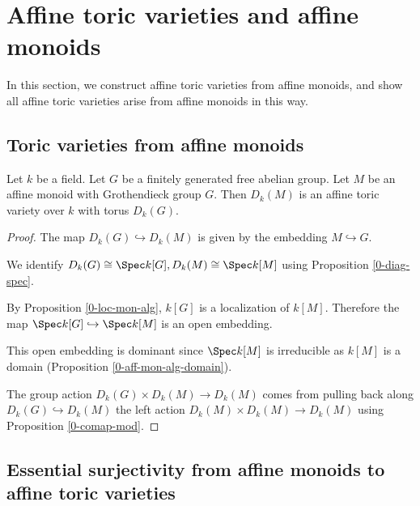 \section{Affine toric varieties and affine monoids}\label{sec:aff-tor-var}


In this section, we construct affine toric varieties from affine monoids,
and show all affine toric varieties arise from affine monoids in this way.


\subsection{Toric varieties from affine monoids}


\begin{proposition}
  \label{1-1-aff-tor-var-diag-aff-mon}

  Let $k$ be a field.
  Let $G$ be a finitely generated free abelian group.
  Let $M$ be an affine monoid with Grothendieck group $G$.
  Then $D_k(M)$ is an affine toric variety over $k$ with torus $D_k(G)$.
\end{proposition}
\begin{proof}

  The map $D_k(G) \hookrightarrow D_k(M)$ is given by the embedding $M \hookrightarrow G$.

  We identify $D_k(G) \cong \Spec k[G], D_k(M) \cong \Spec k[M]$ using
  Proposition \ref{0-diag-spec}.

  By Proposition \ref{0-loc-mon-alg}, $k[G]$ is a localization of $k[M]$.
  Therefore the map $\Spec k[G] \hookrightarrow \Spec k[M]$ is an open embedding.

  This open embedding is dominant since $\Spec k[M]$ is irreducible as $k[M]$ is a domain
  (Proposition \ref{0-aff-mon-alg-domain}).

  The group action $D_k(G) \times D_k(M) \to D_k(M)$ comes
  from pulling back along $D_k(G) \hookrightarrow D_k(M)$
  the left action $D_k(M) \times D_k(M) \to D_k(M)$ using Proposition \ref{0-comap-mod}.
\end{proof}


\subsection{Essential surjectivity from affine monoids to affine toric varieties}


